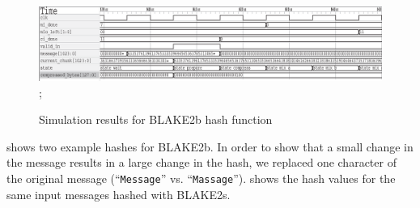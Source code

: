 \documentclass[%
	a4paper,
]
{article}
\newcommand{\done}[1]{}
\begin{document}
\begin{figure}[tb]
	\centering
	\includegraphics[width=\textwidth]{waveform2.eps};
	\caption{Simulation results for BLAKE2b hash function
		\done{Can we draw this in TikZ (using the TikZ timing package)? Adapting
			\Cref{fig:timing} may be the most straight-forward approach.}}
	\label{fig:timing}
\end{figure}
%

 shows two example hashes for BLAKE2b. In order to
show that a small change in the message results in a large change in the hash,
we replaced one character of the original message (``\texttt{\footnotesize{}Message}''
vs. ``\texttt{\footnotesize{}Massage}'').  shows the hash
values for the same input messages hashed with BLAKE2s.
\end{document}

